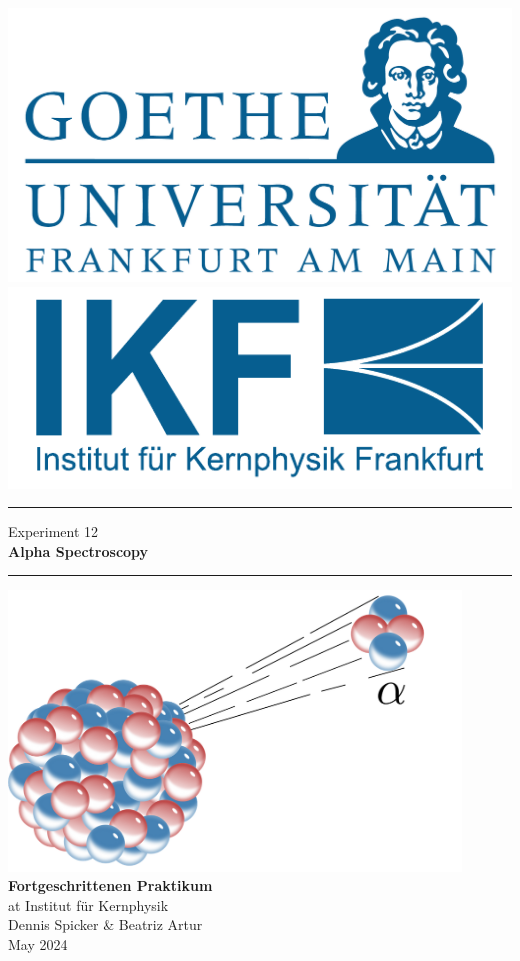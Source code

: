 \documentclass{scrartcl}
\begin{document}
	
\begin{titlepage}
	\newcommand{\HRule}{\rule{\textwidth}{0.5mm}}
	\begin{center}
		{\includegraphics[width=0.3\linewidth]{img/GU-Logo-blau-CMYK} \hfill
			\includegraphics[width=0.3\linewidth]{img/IKF_Logo} \\ }
		\vspace{1cm}
		\HRule
		\vspace{0.4cm}
		{\huge Experiment 12} \\
		\vspace{0.5cm}
		{\huge {\bfseries Alpha Spectroscopy}} \\
		\vspace{0.2cm}
		\HRule
		\vfill
		\includegraphics[width=12cm]{img/front_cover.png}
		\vfill
		{\Large\bfseries Fortgeschrittenen Praktikum} \\
		\vspace{0.3cm}
		{\Large at Institut für Kernphysik} \\
		\vspace{1.5cm}
		{\small 
			Dennis Spicker \& Beatriz Artur \\
			May 2024
		}
	\end{center} 
	\thispagestyle{empty}
	\clearpage
\end{titlepage}

\tableofcontents
\clearpage
\end{document}
